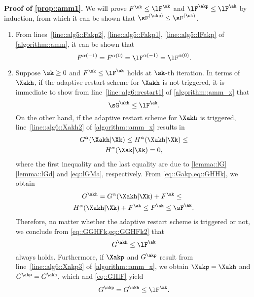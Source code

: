 \noindent\textbf{Proof of \ref{prop::amm1}.\;}  We will prove $F^{\ak}\leq \lF^{\ak}$ and $\lF^{\akp}\leq \lF^{\ak}$ by induction, from which it can be shown that $\sF^{(\skp)}\leq \sF^{(\sk)}$.
\begin{enumerate}[leftmargin=0.5cm]
	\item From lines~\ref{line::alg5::Fakp2}, \ref{line::alg5::Fakp1}, \ref{line::alg5::lFakp} of \cref{algorithm::amm}, it can be shown that 
	\begin{equation}
		\nonumber
		F^{\alpha(-1)}=F^{\alpha(0)}=\lF^{\alpha(-1)}=\lF^{\alpha(0)}.
	\end{equation}
	\item Suppose $\sk\geq 0$ and $F^{\ak}\leq \lF^{\ak}$ holds at $\sk$-th iteration. In terms of $\Xakh$, if the adaptive restart scheme  for $\Xakh$ is not triggered, it is immediate to show from line~\ref{line::alg6::restart1} of \cref{algorithm::amm_x} that
	\begin{equation}\label{eq::GGHFk2}
		\sG^{\akh}  \leq \lF^{\ak}.
	\end{equation}
	On the other hand, if the adaptive restart scheme for $\Xakh$ is triggered, line~\ref{line::alg6::Xakh2} of \cref{algorithm::amm_x} results in
	\begin{multline}\label{eq::GHHk}
	 G^{\alpha}(\Xakh|\Xk) \leq	H^{\alpha}(\Xakh|\Xk)\leq\\  H^{\alpha}(\Xak|\Xk) = 0,
	\end{multline}
	where the first inequality and the last equality are due to \cref{lemma::lG}\ref{lemma::lGd} and \cref{eq::lGMa}, respectively. From \cref{eq::Gakp,eq::GHHk}, we obtain
	\begin{multline}\label{eq::GGHFk}
	\!\!\!G^{\akh} = G^\alpha(\Xakh|\Xk) + F^{\ak}\leq\\
	 H^\alpha(\Xakh|\Xk) + F^{\ak}\leq F^{\ak}\leq \sF^{\ak}.
	\end{multline}
	Therefore, no matter whether the adaptive restart scheme is triggered or not, we conclude from \cref{eq::GGHFk,eq::GGHFk2} that
	\begin{equation}\label{eq::GHlF}
		G^{\akh}\leq  \lF^{\ak}
	\end{equation}
	always holds. Furthermore, if $\Xakp$ and $G^{\akp}$ result from line~\ref{line::alg6::Xakp3} of \cref{algorithm::amm_x}, we obtain $\Xakp=\Xakh$ and $G^{\akp}=G^{\akh}$, which and \cref{eq::GHlF} yield
	\begin{equation}\label{eq::GlFbnd2}
		G^{\akp}=G^{\akh}\leq \lF^{\ak}.
	\end{equation}

\end{enumerate}
